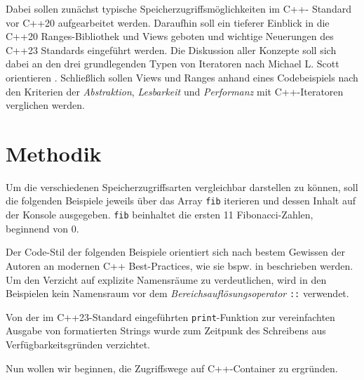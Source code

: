 \documentclass[runningheads]{llncs}
\begin{document}
Dabei sollen zunächst typische Speicherzugriffsmöglichkeiten im C++- Standard vor C++20 aufgearbeitet werden.
Daraufhin soll ein tieferer Einblick in die C++20 Ranges-Bibliothek und Views geboten und wichtige Neuerungen des C++23 Standards eingeführt werden.
Die Diskussion aller Konzepte soll sich dabei an den drei grundlegenden Typen von Iteratoren nach Michael L. Scott orientieren \cite{plp}.
Schließlich sollen Views und Ranges anhand eines Codebeispiels nach den Kriterien der \textit{Abstraktion}, \textit{Lesbarkeit} und \textit{Performanz} mit C++-Iteratoren verglichen werden.

\section{Methodik}

Um die verschiedenen Speicherzugriffsarten vergleichbar darstellen zu können, soll die folgenden Beispiele jeweils über das Array \texttt{fib} iterieren und dessen Inhalt auf der Konsole ausgegeben.
\texttt{fib} beinhaltet die ersten 11 Fibonacci-Zahlen, beginnend von 0.


Der Code-Stil der folgenden Beispiele orientiert sich nach bestem Gewissen der Autoren an modernen C++ Best-Practices, wie sie bspw. in \cite{profcpp} beschrieben werden.
Um den Verzicht auf explizite Namensräume zu verdeutlichen, wird in den Beispielen kein Namensraum vor dem \textit{Bereichsauflösungsoperator} \texttt{::} verwendet.

Von der im C++23-Standard eingeführten \texttt{print}-Funktion zur vereinfachten Ausgabe von formatierten Strings wurde zum Zeitpunk des Schreibens aus Verfügbarkeitsgründen verzichtet.

Nun wollen wir beginnen, die Zugriffswege auf C++-Container zu ergründen.
\end{document}
